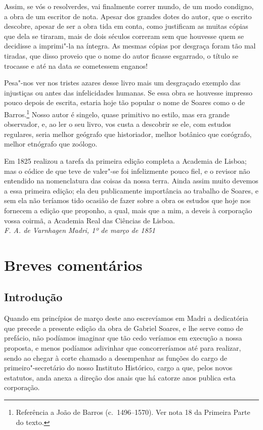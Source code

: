 Assim, se vós o resolverdes, vai finalmente correr mundo, de um 
modo condigno, a obra de um escritor de nota. Apesar dos
grandes dotes do autor, que o escrito descobre, apesar de ser a obra tida 
em conta, como justificam as muitas cópias que dela se tiraram, mais de 
dois séculos correram sem que houvesse quem se decidisse a imprimi"-la 
na íntegra. As mesmas cópias por desgraça foram tão mal tiradas, que 
disso proveio que o nome do autor ficasse esgarrado, o título se trocasse 
e até na data se cometessem enganos!

Pesa"-nos ver nos tristes azares desse livro mais um desgraçado 
exemplo das injustiças ou antes das infelicidades humanas. Se essa obra 
se houvesse impresso pouco depois de escrita, estaria hoje tão popular o 
nome de Soares como o de Barros.\footnote{ Referência a João de Barros (c.~1496--1570). 
Ver nota 18 da Primeira Parte do texto.} Nosso autor é singelo, quase 
primitivo no estilo, mas era grande observador, e, ao ler o seu livro, vos 
custa a descobrir se ele, com estudos regulares, seria melhor geógrafo 
que historiador, melhor botânico que corógrafo, melhor etnógrafo que zoólogo.

Em 1825 realizou a tarefa da primeira edição completa a Academia 
de Lisboa; mas o códice de que teve de valer"-se foi infelizmente pouco 
fiel, e o revisor não entendido na nomenclatura das coisas da nossa terra. 
Ainda assim muito devemos a essa primeira edição; ela deu 
publicamente importância ao trabalho de Soares, e sem ela não teríamos 
tido ocasião de fazer sobre a obra os estudos que hoje nos fornecem a 
edição que proponho, a qual, mais que a mim, a deveis à corporação 
vossa coirmã, a Academia Real das Ciências de Lisboa.\\

\noindent\textit{F. A. de Varnhagen}  \textit{Madri, 1º de março de 1851}\\


\chapter[Breves comentários]{Breves comentários }

\section{Introdução}
\noindent Quando em princípios de março deste ano escrevíamos em Madri a 
dedicatória que precede a presente edição da obra de Gabriel Soares, e 
lhe serve como de prefácio, não podíamos imaginar que tão cedo 
veríamos em execução a nossa proposta, e menos podíamos adivinhar 
que concorreríamos até para realizar, sendo ao chegar à corte chamado a 
desempenhar as funções do cargo de primeiro"-secretário do nosso 
Instituto Histórico, cargo a que, pelos novos estatutos, anda anexa a 
direção dos anais que há catorze anos publica esta corporação.

